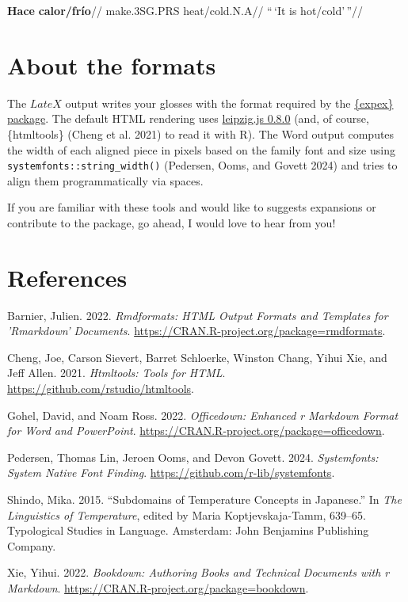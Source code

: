 \documentclass[
]{article}
\newlength{\cslhangindent}
\newenvironment{CSLReferences}[2] %
 {\begin{list}{}{%
  \setlength{\itemindent}{0pt}
  \setlength{\leftmargin}{0pt}
  \setlength{\parsep}{0pt}
  \ifodd #1
   \setlength{\leftmargin}{\cslhangindent}
   \setlength{\itemindent}{-1\cslhangindent}
  \fi
  \setlength{\itemsep}{#2\baselineskip}}}
 {\end{list}}
\begin{document}
\ex\label{formatted} \begingl \gla \textbf{Hace} \textbf{calor/frío}// \glb make.3SG.PRS heat/cold.N.A// \glft ``\,`It is hot/cold'\,''//
\endgl \xe 

\section{About the formats}\label{about-the-formats}

The \(LateX\) output writes your glosses with the format required by the \href{https://ctan.org/pkg/expex}{\{expex\} package}. The default HTML rendering uses \href{https://github.com/bdchauvette/leipzig.js/}{leipzig.js 0.8.0} (and, of course, \{htmltools\} (Cheng et al. 2021) to read it with R). The Word output computes the width of each aligned piece in pixels based on the family font and size using \texttt{systemfonts::string\_width()} (Pedersen, Ooms, and Govett 2024) and tries to align them programmatically via spaces.

If you are familiar with these tools and would like to suggests expansions or contribute to the package, go ahead, I would love to hear from you!

\section*{References}\label{references}

\label{refs}
\begin{CSLReferences}{1}{0}
Barnier, Julien. 2022. \emph{Rmdformats: HTML Output Formats and Templates for 'Rmarkdown' Documents}. \url{https://CRAN.R-project.org/package=rmdformats}.

Cheng, Joe, Carson Sievert, Barret Schloerke, Winston Chang, Yihui Xie, and Jeff Allen. 2021. \emph{Htmltools: Tools for HTML}. \url{https://github.com/rstudio/htmltools}.

Gohel, David, and Noam Ross. 2022. \emph{Officedown: Enhanced r Markdown Format for Word and PowerPoint}. \url{https://CRAN.R-project.org/package=officedown}.

Pedersen, Thomas Lin, Jeroen Ooms, and Devon Govett. 2024. \emph{Systemfonts: System Native Font Finding}. \url{https://github.com/r-lib/systemfonts}.

Shindo, Mika. 2015. {``Subdomains of Temperature Concepts in {Japanese}.''} In \emph{The {Linguistics} of {Temperature}}, edited by Maria Koptjevskaja-Tamm, 639--65. Typological {Studies} in {Language}. {Amsterdam}: {John Benjamins Publishing Company}.

Xie, Yihui. 2022. \emph{Bookdown: Authoring Books and Technical Documents with r Markdown}. \url{https://CRAN.R-project.org/package=bookdown}.

\end{CSLReferences}
\end{document}
